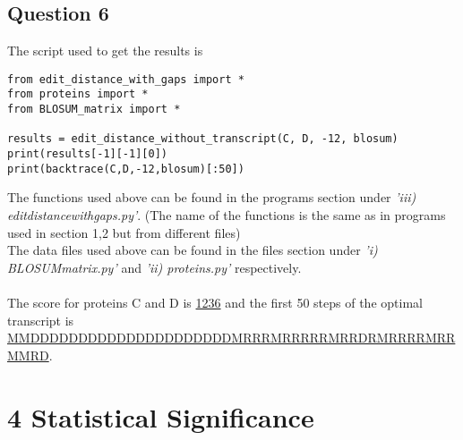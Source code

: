 \documentclass[10pt]{article}
\begin{document}
\subsection*{Question 6}
The script used to get the results is
\begin{lstlisting}
from edit_distance_with_gaps import *
from proteins import *
from BLOSUM_matrix import *

results = edit_distance_without_transcript(C, D, -12, blosum)
print(results[-1][-1][0])
print(backtrace(C,D,-12,blosum)[:50])
\end{lstlisting}
The functions used above can be found in the programs section under \emph{'iii) edit\textunderscore distance\textunderscore with\textunderscore gaps.py'}. (The name of the functions is the same as in programs used in section 1,2 but from different files)\\
The data files used above can be found in the files section under \emph{'i) BLOSUM\textunderscore matrix.py'} and \emph{'ii) proteins.py'} respectively.\\\\
The score for proteins C and D is \underline{1236} and the first 50 steps of the optimal transcript is \\ \underline{MMDDDDDDDDDDDDDDDDDDDDDMRRRMRRRRRMRRDRMRRRRMRRMMRD}.


\section*{4 Statistical Significance}
\end{document}
